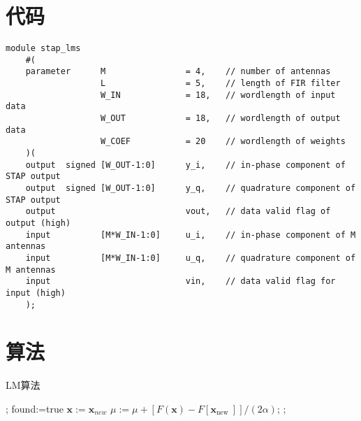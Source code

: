 \section{代码}
{\fontsize{10pt}{0.5\baselineskip}\selectfont
	\begin{lstlisting}[caption={空时~LMS~算法~Verilog~模块端口声明},label={list:code_appB_lms}]
	module stap_lms
	#(
	parameter      M                = 4,    // number of antennas
	               L                = 5,    // length of FIR filter
	               W_IN             = 18,   // wordlength of input data
	               W_OUT            = 18,   // wordlength of output data
	               W_COEF           = 20    // wordlength of weights
	)(
	output  signed [W_OUT-1:0]      y_i,    // in-phase component of STAP output
	output  signed [W_OUT-1:0]      y_q,    // quadrature component of STAP output
	output                          vout,   // data valid flag of output (high)
	input          [M*W_IN-1:0]     u_i,    // in-phase component of M antennas
	input          [M*W_IN-1:0]     u_q,    // quadrature component of M antennas
	input                           vin,    // data valid flag for input (high)
	);
	\end{lstlisting}
}
\section{算法}
\begin{algorithm}[!ht]  
    \caption{ LM算法}
    \label{algo:lm}
    \begin{algorithmic}[1]  
      ;
            \State found:=true
        \Else
                \State $\mathbf{x}:=\mathbf{x}_{new}$
            \Else
                \State $\mu:=\mu+\left[F(\mathbf{x})-F\left[\mathbf{x}_{\text {new }}\right]\right] /(2 \alpha)$;
            \EndIf
        \EndIf
      \EndWhile;
    \end{algorithmic}  
\end{algorithm}